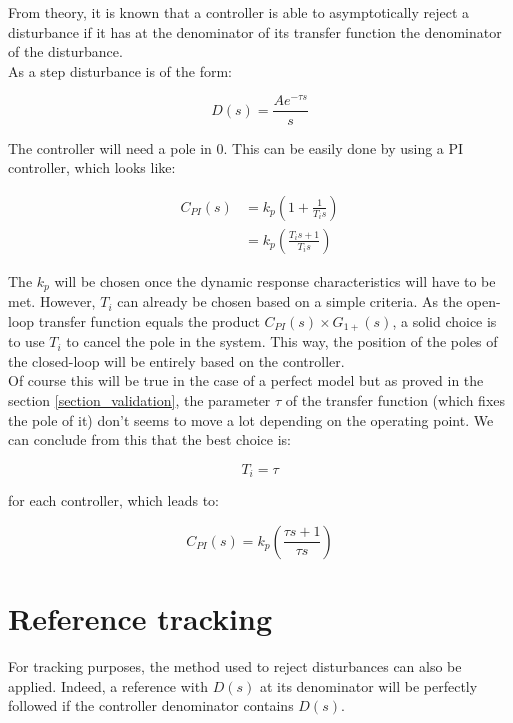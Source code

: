 From theory, it is known that a controller is able to asymptotically reject a disturbance if it has at the denominator
of its transfer function the denominator of the disturbance.\\

As a step disturbance is of the form:

\begin{equation}
    D(s) = \frac{A e^{-\tau s}}{s}
\end{equation}

The controller will need a pole in $0$. This can be easily done by using a PI controller, which looks like:

\begin{align}
    C_{PI}(s) &= k_p \left( 1 + \frac{1}{T_i s} \right)\\
    &= k_p \left(\frac{T_i s + 1}{T_i s} \right)
    \label{eq:general_PI}
\end{align}

The $k_p$ will be chosen once the dynamic response characteristics will have to be met. However, $T_i$ can already be 
chosen based on a simple criteria. As the open-loop transfer function equals the product $C_{PI}(s) \times G_{1+} (s)$, a
solid choice is to use $T_i$ to cancel the pole in the system. This way, the position of the poles of the closed-loop
will be entirely based on the controller.\\
Of course this will be true in the case of a perfect model but as proved in the section \ref{section_validation}, the
parameter $\tau$ of the transfer function (which fixes the pole of it) don't seems to move a lot depending on the 
operating point. We can conclude from this that the best choice is:

\begin{equation}
    T_i = \tau
\end{equation}

for each controller, which leads to:

\begin{equation}
    C_{PI}(s) = k_p \left( \frac{\tau s + 1}{\tau s} \right) 
    \label{eq:controller_PI}
\end{equation}

\section{Reference tracking}

For tracking purposes, the method used to reject disturbances can also be applied. Indeed, a reference with $D(s)$ at
its denominator will be perfectly followed if the controller denominator contains $D(s)$.


